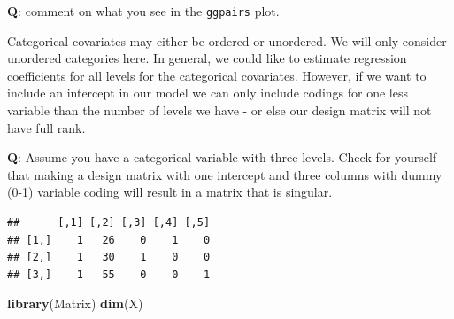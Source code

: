 \documentclass[
]{article}
\newenvironment{Shaded}{\begin{snugshade}}{\end{snugshade}}
\newcommand{\CommentTok}[1]{\textcolor[rgb]{0.56,0.35,0.01}{\textit{#1}}}
\newcommand{\DecValTok}[1]{\textcolor[rgb]{0.00,0.00,0.81}{#1}}
\newcommand{\FunctionTok}[1]{\textcolor[rgb]{0.13,0.29,0.53}{\textbf{#1}}}
\newcommand{\NormalTok}[1]{#1}
\newcommand{\OtherTok}[1]{\textcolor[rgb]{0.56,0.35,0.01}{#1}}
\newcommand{\SpecialCharTok}[1]{\textcolor[rgb]{0.81,0.36,0.00}{\textbf{#1}}}
\newcommand{\StringTok}[1]{\textcolor[rgb]{0.31,0.60,0.02}{#1}}
\begin{document}
\textbf{Q}: comment on what you see in the \texttt{ggpairs} plot.

Categorical covariates may either be ordered or unordered. We will only
consider unordered categories here. In general, we could like to
estimate regression coefficients for all levels for the categorical
covariates. However, if we want to include an intercept in our model we
can only include codings for one less variable than the number of levels
we have - or else our design matrix will not have full rank.

\textbf{Q}: Assume you have a categorical variable with three levels.
Check for yourself that making a design matrix with one intercept and
three columns with dummy (0-1) variable coding will result in a matrix
that is singular.

\begin{Shaded}
\end{Shaded}

\begin{verbatim}
##      [,1] [,2] [,3] [,4] [,5]
## [1,]    1   26    0    1    0
## [2,]    1   30    1    0    0
## [3,]    1   55    0    0    1
\end{verbatim}

\begin{Shaded}
\begin{Highlighting}[]
\FunctionTok{library}\NormalTok{(Matrix)}
\FunctionTok{dim}\NormalTok{(X)}
\end{Highlighting}
\end{Shaded}
\end{document}
